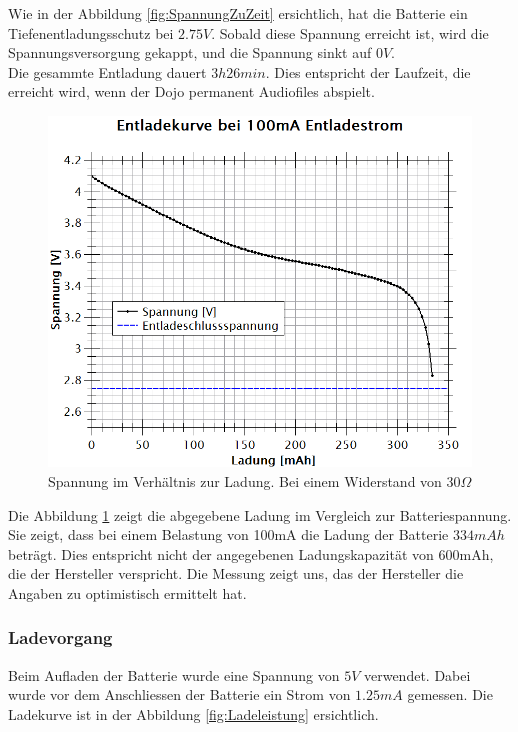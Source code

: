 Wie in der Abbildung \ref{fig:SpannungZuZeit} ersichtlich, hat die Batterie ein Tiefenentladungsschutz bei $2.75V$. Sobald diese Spannung erreicht ist, wird die Spannungsversorgung gekappt, und die Spannung sinkt auf $0V$.\\
Die gesammte Entladung dauert $3h 26min$. Dies entspricht der Laufzeit, die erreicht wird, wenn der Dojo permanent Audiofiles abspielt.

\newpage

\begin{figure}[h]
	\centering
	\includegraphics[width=\textwidth]{graphics/SpannungzuLadung.png}
	\caption{Spannung im Verhältnis zur Ladung. Bei einem Widerstand von 30$\Omega$}
	\label{fig:SpannungZuLadung}
\end{figure}

Die Abbildung \ref{fig:SpannungZuLadung} zeigt die abgegebene Ladung im Vergleich zur Batteriespannung. Sie zeigt, dass bei einem Belastung von 100mA die Ladung der Batterie $334mAh$ beträgt. Dies entspricht nicht der angegebenen Ladungskapazität von 600mAh, die der Hersteller verspricht. Die Messung zeigt uns, das der Hersteller die Angaben zu optimistisch ermittelt hat.

\newpage

\subsubsection*{Ladevorgang}
\label{sec:Ladevorgang}
Beim Aufladen der Batterie wurde eine Spannung von $5V$ verwendet. Dabei wurde vor dem Anschliessen der Batterie ein Strom von $1.25mA$ gemessen. Die Ladekurve ist in der Abbildung                       \ref{fig:Ladeleistung} ersichtlich.

